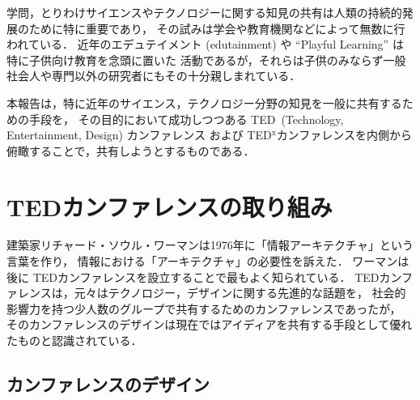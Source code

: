 \documentclass[submit,techreq,jkeyword,noauthor]{ipsj}
\newcommand{\TED}{\textrm{TED}}
\newcommand{\TEDx}{\TED${}^{\textrm{x}}$}
\begin{document}
学問，とりわけサイエンスやテクノロジーに関する知見の共有は人類の持続的発展のために特に重要であり，
その試みは学会や教育機関などによって無数に行われている．
近年のエデュテイメント (edutainment) や ``Playful Learning'' は特に子供向け教育を念頭に置いた
活動であるが，それらは子供のみならず一般社会人や専門以外の研究者にもその十分親しまれている．\cite{nu}



本報告は，特に近年のサイエンス，テクノロジー分野の知見を一般に共有するための手段を，
その目的において成功しつつある \TED\ (Technology, Entertainment, Design) カンファレンス
および \TEDx カンファレンスを内側から俯瞰することで，共有しようとするものである．


\section{TEDカンファレンスの取り組み}

建築家リチャード・ソウル・ワーマンは1976年に「情報アーキテクチャ」という言葉を作り，
情報における「アーキテクチャ」の必要性を訴えた．\cite{rsw}
ワーマンは後に \TED カンファレンスを設立することで最もよく知られている．
\TED カンファレンスは，元々はテクノロジー，デザインに関する先進的な話題を，
社会的影響力を持つ少人数のグループで共有するためのカンファレンスであったが，
そのカンファレンスのデザインは現在ではアイディアを共有する手段として優れたものと認識されている．

\subsection{カンファレンスのデザイン}
\end{document}
